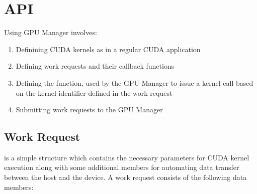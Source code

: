 \documentclass[10pt]{report}
\begin{document}
\section{API}

Using GPU Manager involves:
\begin{enumerate}
\item Definining CUDA kernels as in a regular CUDA application
\item Defining work requests and their callback functions
\item Defining the  function, used by the GPU Manager to issue a kernel call based on the kernel identifier defined in the work request
\item Submitting work requests to the GPU Manager
\end{enumerate}

\subsection{Work Request}
 is a simple structure which contains the necessary parameters
for CUDA kernel execution along with some additional members for automating
data transfer between the host and the device.
A work request consists of the following data members:
\end{document}
